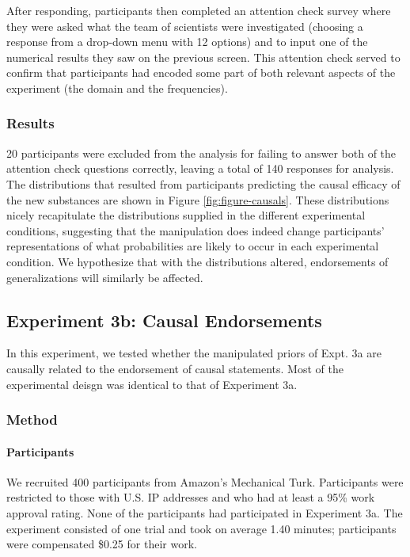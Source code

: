 \documentclass[english,floatsintext,man]{apa6}
\theoremstyle{definition}
\theoremstyle{definition}
\theoremstyle{definition}
\theoremstyle{remark}
\begin{document}
After responding, participants then completed an attention check survey
where they were asked what the team of scientists were investigated
(choosing a response from a drop-down menu with 12 options) and to input
one of the numerical results they saw on the previous screen. This
attention check served to confirm that participants had encoded some
part of both relevant aspects of the experiment (the domain and the
frequencies).

\subsubsection{Results}\label{results-4}

20 participants were excluded from the analysis for failing to answer
both of the attention check questions correctly, leaving a total of 140
responses for analysis. The distributions that resulted from
participants predicting the causal efficacy of the new substances are
shown in Figure \ref{fig:figure-causals}. These distributions nicely
recapitulate the distributions supplied in the different experimental
conditions, suggesting that the manipulation does indeed change
participants' representations of what probabilities are likely to occur
in each experimental condition. We hypothesize that with the
distributions altered, endorsements of generalizations will similarly be
affected.

\subsection{Experiment 3b: Causal
Endorsements}\label{experiment-3b-causal-endorsements}

In this experiment, we tested whether the manipulated priors of Expt. 3a
are causally related to the endorsement of causal statements. Most of
the experimental deisgn was identical to that of Experiment 3a.

\subsubsection{Method}\label{method-6}

\paragraph{Participants}\label{participants-6}

We recruited 400 participants from Amazon's Mechanical Turk.
Participants were restricted to those with U.S. IP addresses and who had
at least a 95\% work approval rating. None of the participants had
participated in Experiment 3a. The experiment consisted of one trial and
took on average 1.40 minutes; participants were compensated \$0.25 for
their work.
\end{document}
